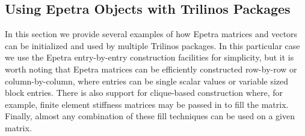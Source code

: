 \documentclass[12pt,relax]{TPA}
\begin{document}
%
%

\subsection{Using Epetra Objects with Trilinos Packages}

In this section we provide several examples of how Epetra matrices and
vectors can be initialized and used by multiple
Trilinos packages.  In this particular case we use the Epetra
entry-by-entry construction facilities for simplicity, but it is
worth noting that Epetra matrices can be efficiently constructed
row-by-row or column-by-column, where entries can be
single scalar values or variable sized block entries.  There is also
support for clique-based construction where, for example, finite element
stiffness matrices may be passed in to fill the matrix.  Finally,
almost any combination of these fill techniques can be used on a given
matrix.
\end{document}
